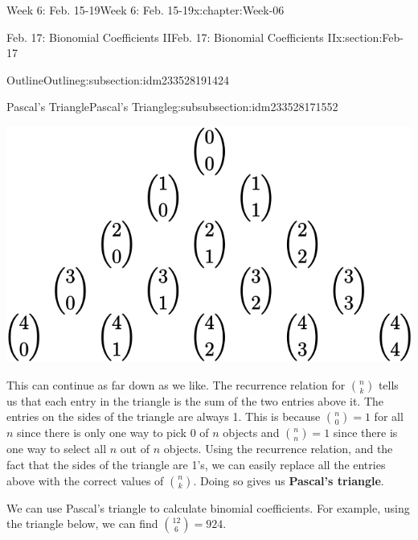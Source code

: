 \documentclass[oneside,10pt,]{book}
\newcommand{\terminology}[1]{\textbf{#1}}
\numberwithin{equation}{section}
\begin{document}
\begin{chapterptx}{Week 6: Feb. 15-19}{}{Week 6: Feb. 15-19}{}{}{x:chapter:Week-06}
\begin{sectionptx}{Feb. 17: Bionomial Coefficients II}{}{Feb. 17: Bionomial Coefficients II}{}{}{x:section:Feb-17}
\begin{subsectionptx}{Outline}{}{Outline}{}{}{g:subsection:idm233528191424}
\begin{subsubsectionptx}{Pascal's Triangle}{}{Pascal's Triangle}{}{}{g:subsubsection:idm233528171552}
\begin{sidebyside}{1}{0.15}{0.15}{0}
\begin{sbspanel}{0.7}
\includegraphics[width=\linewidth]{./img/pascal-nCk.svg}
\end{sbspanel}%
\end{sidebyside}%
\par
This can continue as far down as we like. The recurrence relation for \({n \choose k}\) tells us that each entry in the triangle is the sum of the two entries above it. The entries on the sides of the triangle are always 1. This is because \({n \choose 0} = 1\) for all \(n\) since there is only one way to pick 0 of \(n\) objects and \({n \choose n} = 1\) since there is one way to select all \(n\) out of \(n\) objects. Using the recurrence relation, and the fact that the sides of the triangle are 1's, we can easily replace all the entries above with the correct values of \({n \choose k}\). Doing so gives us \terminology{Pascal's triangle}. %
\par
We can use Pascal's triangle to calculate binomial coefficients. For example, using the triangle below, we can find \({12 \choose 6} = 924\).%
\begin{sidebyside}{1}{0}{0}{0}%
\begin{sbspanel}{1}%

\end{sbspanel}
\end{sidebyside}
\end{subsubsectionptx}
\end{subsectionptx}
\end{sectionptx}
\end{chapterptx}
\end{document}
